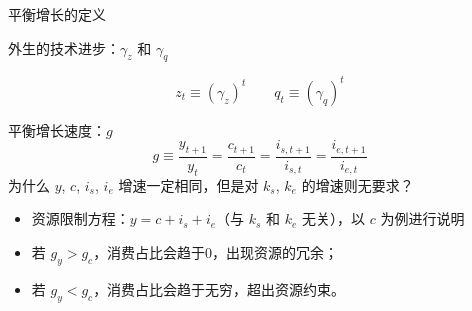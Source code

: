 \documentclass[aspectratio=169,10pt]{beamer}
\begin{document}


\begin{frame}{平衡增长的定义}
  \small
  \begin{block}{外生的技术进步：$\gamma_z$ 和 $\gamma_q$}

    \begin{equation*}
      z_t \equiv \left(\gamma_z\right)^t \qquad q_t \equiv \left(\gamma_q\right)^t
    \end{equation*}
  \end{block}
  \begin{block}{平衡增长速度：$g$}
    \begin{equation*}
      g \equiv \dfrac{y_{t+1}}{y_t}  = \dfrac{c_{t+1}}{c_{t}} = \dfrac{i_{s,t+1}}{i_{s,t}} = \dfrac{i_{e,t+1}}{i_{e,t}}
    \end{equation*}
    为什么 $y$, $c$, $i_s$, $i_e$ 增速一定相同，但是对 $k_s$, $k_e$ 的增速则无要求？
    \begin{itemize}
      \item 资源限制方程：$y = c + i_s + i_e$（与 $k_s$ 和 $k_e$ 无关），以 $c$ 为例进行说明
      \item 若 $g_y > g_c$，消费占比会趋于0，出现资源的冗余；
      \item 若 $g_y < g_c$，消费占比会趋于无穷，超出资源约束。
    \end{itemize}
  \end{block}
\end{frame}
\end{document}
